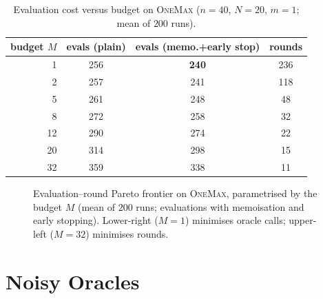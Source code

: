 \documentclass[11pt,a4paper]{article}
\newcommand{\E}{\mathbb{E}}
\newcommand{\evals}{\mathcal{E}}
\begin{document}
\begin{table}[ht]
\centering
\caption{Evaluation cost versus budget on \textsc{OneMax}
  ($n=40$, $N=20$, $m=1$; mean of $200$ runs).}
\label{tab:eval}
\renewcommand{\arraystretch}{1.15}
\begin{tabular}{@{}rccc@{}}
\toprule
budget $M$ & evals (plain) & evals (memo.+early stop) & rounds \\
\midrule
1 & 256 & \textbf{240} & 236 \\
2 & 257 & 241 & 118 \\
5 & 261 & 248 & 48 \\
8 & 272 & 258 & 32 \\
12 & 290 & 274 & 22 \\
20 & 314 & 298 & 15 \\
32 & 359 & 338 & 11 \\
\bottomrule
\end{tabular}
\end{table}

\begin{figure}[ht]
\centering
{}
\caption{Evaluation--round Pareto frontier on \textsc{OneMax}, parametrised
  by the budget $M$ (mean of $200$ runs; evaluations with memoisation and
  early stopping).  Lower-right ($M=1$) minimises oracle calls;
  upper-left ($M=32$) minimises rounds.}
\label{fig:pareto}
\end{figure}

\section{Noisy Oracles}\label{sec:noisy}
\end{document}
